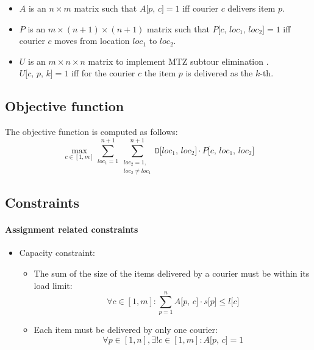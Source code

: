 \begin{itemize}
    \item $A$ is an $n \times m$ matrix such that $A\texttt{[$p$, $c$]} = 1$ iff courier $c$ delivers item $p$.

    \item $P$ is an $m \times (n+1) \times (n+1)$ matrix such that $P\texttt{[$c$, $loc_1$, $loc_2$]} = 1$ iff courier $c$ moves from location $loc_1$ to $loc_2$.

    \item $U$ is an $m \times n \times n$ matrix to implement MTZ subtour elimination \cite{mtz_subtour}. $U\texttt{[$c$, $p$, $k$]} = 1$ iff for the courier $c$ the item $p$ is delivered as the $k$-th.
\end{itemize}

\subsection{Objective function}

The objective function is computed as follows:
\begin{equation}
    \label{eq:obj_fun}
    \max_{c \in [1, m]}
    \sum_{loc_1=1}^{n+1} \sum_{\substack{loc_2=1,\\loc_2 \neq loc_1}}^{n+1} \texttt{D[$loc_1$, $loc_2$]} \cdot P\texttt{[$c$, $loc_1$, $loc_2$]}
\end{equation}


\subsection{Constraints}

\paragraph*{Assignment related constraints}

\begin{itemize}
    \item Capacity constraint:
    \begin{itemize}
        \item The sum of the size of the items delivered by a courier must be within its load limit:
        \begin{equation}
            \label{eq:capacity1}
            \forall c \in [1, m]:
            \sum_{p=1}^{n} A\texttt{[$p$, $c$]} \cdot s\texttt{[$p$]} \leq \texttt{$l$[$c$]}
        \end{equation}
        \item Each item must be delivered by only one courier:
        \begin{equation}
            \label{eq:capacity2}
            \forall p \in [1, n], \exists! c \in [1, m]: A\texttt{[$p$, $c$]} = 1
        \end{equation}
    \end{itemize}
\end{itemize}

